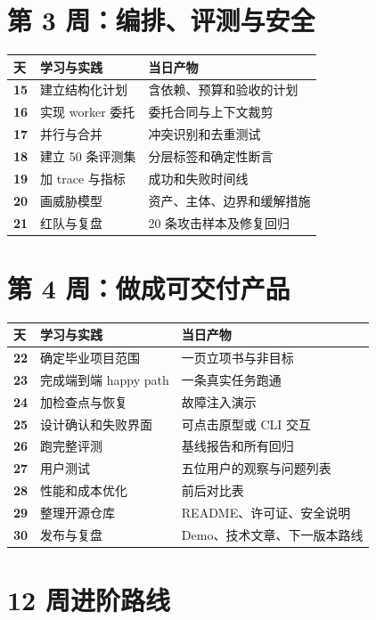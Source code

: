 \section{第 3 周：编排、评测与安全}

\begin{longtable}{>{\bfseries}p{} p{} p{}}
\toprule
天 & 学习与实践 & 当日产物 \\
\midrule
15 & 建立结构化计划 & 含依赖、预算和验收的计划 \\
16 & 实现 worker 委托 & 委托合同与上下文裁剪 \\
17 & 并行与合并 & 冲突识别和去重测试 \\
18 & 建立 50 条评测集 & 分层标签和确定性断言 \\
19 & 加 trace 与指标 & 成功和失败时间线 \\
20 & 画威胁模型 & 资产、主体、边界和缓解措施 \\
21 & 红队与复盘 & 20 条攻击样本及修复回归 \\
\bottomrule
\end{longtable}

\section{第 4 周：做成可交付产品}

\begin{longtable}{>{\bfseries}p{} p{} p{}}
\toprule
天 & 学习与实践 & 当日产物 \\
\midrule
22 & 确定毕业项目范围 & 一页立项书与非目标 \\
23 & 完成端到端 happy path & 一条真实任务跑通 \\
24 & 加检查点与恢复 & 故障注入演示 \\
25 & 设计确认和失败界面 & 可点击原型或 CLI 交互 \\
26 & 跑完整评测 & 基线报告和所有回归 \\
27 & 用户测试 & 五位用户的观察与问题列表 \\
28 & 性能和成本优化 & 前后对比表 \\
29 & 整理开源仓库 & README、许可证、安全说明 \\
30 & 发布与复盘 & Demo、技术文章、下一版本路线 \\
\bottomrule
\end{longtable}

\section{12 周进阶路线}

